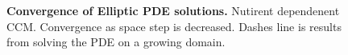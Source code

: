 \documentclass[12pt]{article}
\begin{document}
\begin{figure}[htpb]
\vspace{-0.5cm}
\caption{{\bf Convergence of Elliptic PDE solutions.} 
	Nutirent dependenent CCM. Convergence as space step is decreased. Dashes line is results from solving the PDE on a growing domain. }
\label{fig:2druntime}
\end{figure}
\end{document}

